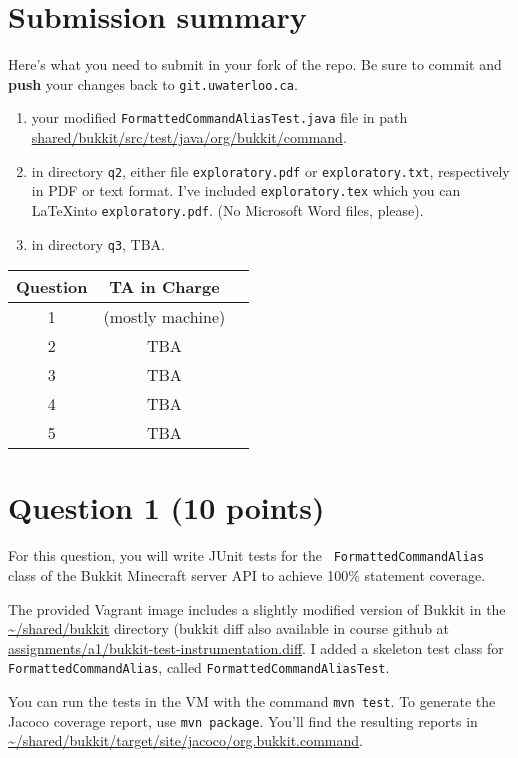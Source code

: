 \documentclass[10pt,hidelinks]{article}
\begin{document}
\section*{Submission summary}
Here's what you need to submit in your fork of the repo. Be sure to commit
and {\bf push} your changes back to {\tt git.uwaterloo.ca}.
\begin{enumerate}
\item your modified {\tt FormattedCommandAliasTest.java} file in path
\url{shared/bukkit/src/test/java/org/bukkit/command}.
\item in directory {\tt q2}, either file {\tt exploratory.pdf} or {\tt exploratory.txt}, respectively
in PDF or text format. I've included {\tt exploratory.tex} which you can
\LaTeX into {\tt exploratory.pdf}. (No Microsoft Word files, please).
\item in directory {\tt q3}, TBA.
\end{enumerate}
 
 \begin{center}
 \begin{tabular}{c|cc}
 Question   &  TA in Charge \\ \hline
1 & (mostly machine) \\ 
2 & TBA \\ 
3 & TBA \\ 
4 & TBA \\
5 & TBA
 \end{tabular}
 \end{center}

\newpage

\section*{Question 1 (10 points)}
For this question, you will write JUnit tests for the {\tt
  FormattedCommandAlias} class of the Bukkit Minecraft server API to
achieve 100\% statement coverage.

The provided Vagrant image includes a slightly modified version of
Bukkit in the \url{~/shared/bukkit} directory (bukkit diff also available in course
github at \url{assignments/a1/bukkit-test-instrumentation.diff}.  
I added a skeleton test class for {\tt
  FormattedCommandAlias}, called {\tt FormattedCommandAliasTest}.

You can run the tests in the VM with the command {\tt mvn test}.  To
generate the Jacoco coverage report, use {\tt mvn package}. You'll
find the resulting reports in
\url{~/shared/bukkit/target/site/jacoco/org.bukkit.command}.
\end{document}
